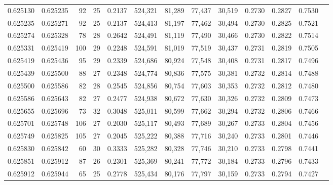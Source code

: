 \begin{tabular}{rrrrrrrrrrrrr}
0.625130 & 0.625235 &  92 &  25 &                                     0.2137 & 524,321 &  81,289 &  77,437 &  30,519 & 0.2730 & 0.2827 & 0.7530 \\
0.625235 & 0.625271 &  92 &  25 &                                     0.2137 & 524,413 &  81,197 &  77,462 &  30,494 & 0.2730 & 0.2825 & 0.7521 \\
0.625274 & 0.625328 &  78 &  28 &                                     0.2642 & 524,491 &  81,119 &  77,490 &  30,466 & 0.2730 & 0.2822 & 0.7514 \\
0.625331 & 0.625419 & 100 &  29 &                                     0.2248 & 524,591 &  81,019 &  77,519 &  30,437 & 0.2731 & 0.2819 & 0.7505 \\
0.625419 & 0.625436 &  95 &  29 &                                     0.2339 & 524,686 &  80,924 &  77,548 &  30,408 & 0.2731 & 0.2817 & 0.7496 \\
0.625439 & 0.625500 &  88 &  27 &                                     0.2348 & 524,774 &  80,836 &  77,575 &  30,381 & 0.2732 & 0.2814 & 0.7488 \\
0.625500 & 0.625586 &  82 &  28 &                                     0.2545 & 524,856 &  80,754 &  77,603 &  30,353 & 0.2732 & 0.2812 & 0.7480 \\
0.625586 & 0.625643 &  82 &  27 &                                     0.2477 & 524,938 &  80,672 &  77,630 &  30,326 & 0.2732 & 0.2809 & 0.7473 \\
0.625655 & 0.625696 &  73 &  32 &                                     0.3048 & 525,011 &  80,599 &  77,662 &  30,294 & 0.2732 & 0.2806 & 0.7466 \\
0.625701 & 0.625748 & 106 &  27 &                                     0.2030 & 525,117 &  80,493 &  77,689 &  30,267 & 0.2733 & 0.2804 & 0.7456 \\
0.625749 & 0.625825 & 105 &  27 &                                     0.2045 & 525,222 &  80,388 &  77,716 &  30,240 & 0.2733 & 0.2801 & 0.7446 \\
0.625830 & 0.625842 &  60 &  30 &                                     0.3333 & 525,282 &  80,328 &  77,746 &  30,210 & 0.2733 & 0.2798 & 0.7441 \\
0.625851 & 0.625912 &  87 &  26 &                                     0.2301 & 525,369 &  80,241 &  77,772 &  30,184 & 0.2733 & 0.2796 & 0.7433 \\
0.625912 & 0.625944 &  65 &  25 &                                     0.2778 & 525,434 &  80,176 &  77,797 &  30,159 & 0.2733 & 0.2794 & 0.7427 \\

\end{tabular}
